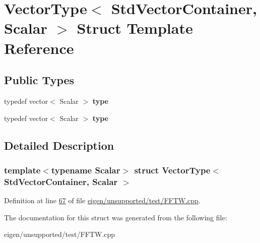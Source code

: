 \hypertarget{struct_vector_type_3_01_std_vector_container_00_01_scalar_01_4}{}\section{Vector\+Type$<$ Std\+Vector\+Container, Scalar $>$ Struct Template Reference}
\label{struct_vector_type_3_01_std_vector_container_00_01_scalar_01_4}
\subsection*{Public Types}
\begin{DoxyCompactItemize}
\item 
\mbox{\label{struct_vector_type_3_01_std_vector_container_00_01_scalar_01_4_a65572f8f5f36d59d933c9e669b7849f2}} 
typedef vector$<$ Scalar $>$ {\bfseries type}
\item 
\mbox{\label{struct_vector_type_3_01_std_vector_container_00_01_scalar_01_4_a65572f8f5f36d59d933c9e669b7849f2}} 
typedef vector$<$ Scalar $>$ {\bfseries type}
\end{DoxyCompactItemize}


\subsection{Detailed Description}
\subsubsection*{template$<$typename Scalar$>$\newline
struct Vector\+Type$<$ Std\+Vector\+Container, Scalar $>$}



Definition at line \hyperlink{eigen_2unsupported_2test_2_f_f_t_w_8cpp_source_l00067}{67} of file \hyperlink{eigen_2unsupported_2test_2_f_f_t_w_8cpp_source}{eigen/unsupported/test/\+F\+F\+T\+W.\+cpp}.



The documentation for this struct was generated from the following file\+:\begin{DoxyCompactItemize}
\item 
eigen/unsupported/test/\+F\+F\+T\+W.\+cpp\end{DoxyCompactItemize}
